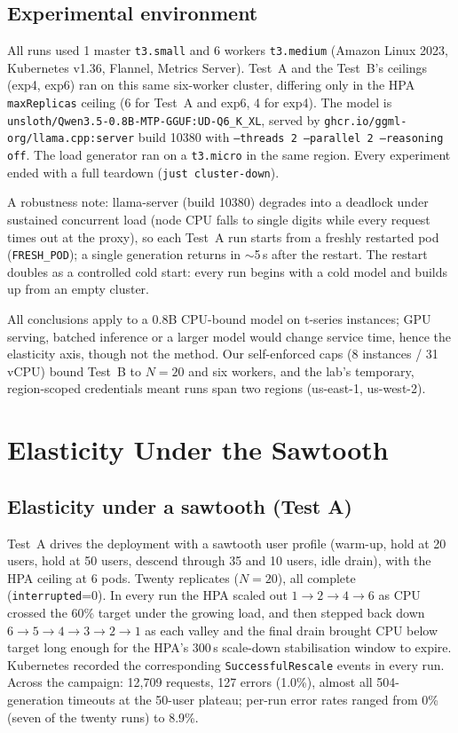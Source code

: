 \documentclass[conference]{IEEEtran}
\newcommand{\code}[1]{\texttt{#1}}
\begin{document}
\subsection{Experimental environment}
\label{sec:env}

All runs used 1 master \code{t3.small} and 6 workers \code{t3.medium} (Amazon
Linux 2023, Kubernetes v1.36, Flannel, Metrics Server). Test~A and the
Test~B's ceilings (exp4, exp6) ran on this same six-worker cluster, differing
only in the HPA \code{maxReplicas} ceiling (6 for Test~A and exp6, 4 for
exp4). The model is \code{unsloth/Qwen3.5-0.8B-MTP-GGUF:UD-Q6\_K\_XL}, served
by \code{ghcr.io/ggml-org/llama.cpp:server} build 10380 with
\code{--threads 2 --parallel 2 --reasoning off}. The load generator ran on a
\code{t3.micro} in the same region. Every experiment ended with a full
teardown (\code{just cluster-down}).

A robustness note: llama-server (build 10380) degrades into a deadlock under
sustained concurrent load (node CPU falls to single digits while every
request times out at the proxy), so each Test~A run starts from a freshly
restarted pod (\code{FRESH\_POD}); a single generation returns in $\sim$5\,s after
the restart. The restart doubles as a controlled cold start: every run
begins with a cold model and builds up from an empty cluster.

All conclusions apply to a 0.8B CPU-bound model on t-series instances; GPU
serving, batched inference or a larger model would change service time,
hence the elasticity axis, though not the method. Our self-enforced caps (8
instances / 31 vCPU) bound Test~B to $N{=}20$ and six workers,
and the lab's temporary, region-scoped credentials meant runs span two
regions (us-east-1, us-west-2).

\section{Elasticity Under the Sawtooth}
\label{sec:campaignA}

\subsection{Elasticity under a sawtooth (Test A)}
\label{sec:elasticity}

Test~A drives the deployment with a sawtooth user profile (warm-up, hold at
20 users, hold at 50 users, descend through 35 and 10 users, idle drain),
with the HPA ceiling at 6 pods. Twenty replicates ($N{=}20$), all complete
(\code{interrupted}=0). In every run the HPA scaled out $1{\to}2{\to}4{\to}6$
as CPU crossed the 60\% target under the growing load, and then stepped back
down $6{\to}5{\to}4{\to}3{\to}2{\to}1$ as each valley and the final drain
brought CPU below target long enough for the HPA's 300\,s scale-down
stabilisation window to expire. Kubernetes recorded the corresponding
\code{SuccessfulRescale} events in every run. Across the campaign: 12{,}709
requests, 127 errors (1.0\%), almost all 504-generation timeouts at the
50-user plateau; per-run error rates ranged from 0\% (seven of the twenty
runs) to 8.9\%.
\end{document}
